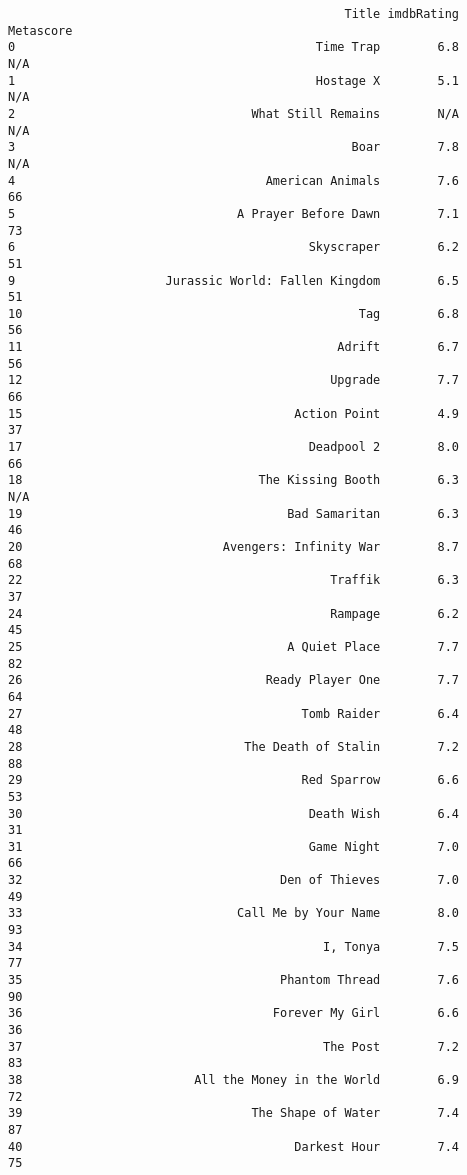 \documentclass[11pt]{article}
\begin{document}
    
    \begin{verbatim}
                                               Title imdbRating Metascore
0                                          Time Trap        6.8       N/A
1                                          Hostage X        5.1       N/A
2                                 What Still Remains        N/A       N/A
3                                               Boar        7.8       N/A
4                                   American Animals        7.6        66
5                               A Prayer Before Dawn        7.1        73
6                                         Skyscraper        6.2        51
9                     Jurassic World: Fallen Kingdom        6.5        51
10                                               Tag        6.8        56
11                                            Adrift        6.7        56
12                                           Upgrade        7.7        66
15                                      Action Point        4.9        37
17                                        Deadpool 2        8.0        66
18                                 The Kissing Booth        6.3       N/A
19                                     Bad Samaritan        6.3        46
20                            Avengers: Infinity War        8.7        68
22                                           Traffik        6.3        37
24                                           Rampage        6.2        45
25                                     A Quiet Place        7.7        82
26                                  Ready Player One        7.7        64
27                                       Tomb Raider        6.4        48
28                               The Death of Stalin        7.2        88
29                                       Red Sparrow        6.6        53
30                                        Death Wish        6.4        31
31                                        Game Night        7.0        66
32                                    Den of Thieves        7.0        49
33                              Call Me by Your Name        8.0        93
34                                          I, Tonya        7.5        77
35                                    Phantom Thread        7.6        90
36                                   Forever My Girl        6.6        36
37                                          The Post        7.2        83
38                        All the Money in the World        6.9        72
39                                The Shape of Water        7.4        87
40                                      Darkest Hour        7.4        75

\end{verbatim}
\end{document}
